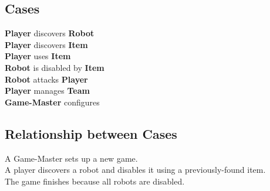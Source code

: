 \documentclass{article}
\begin{document}
\subsection{Cases}
\textbf{Player} discovers \textbf{Robot}\\
\textbf{Player} discovers \textbf{Item}\\
\textbf{Player} uses \textbf{Item}\\
\textbf{Robot} is disabled by \textbf{Item}\\
\textbf{Robot} attacks \textbf{Player}\\
\textbf{Player} manages \textbf{Team}\\
\textbf{Game-Master} configures\\
\subsection{Relationship between Cases}
A Game-Master sets up a new game.\\
A player discovers a robot and disables it using a previously-found item.\\
The game finishes because all robots are disabled.\\
\end{document}
